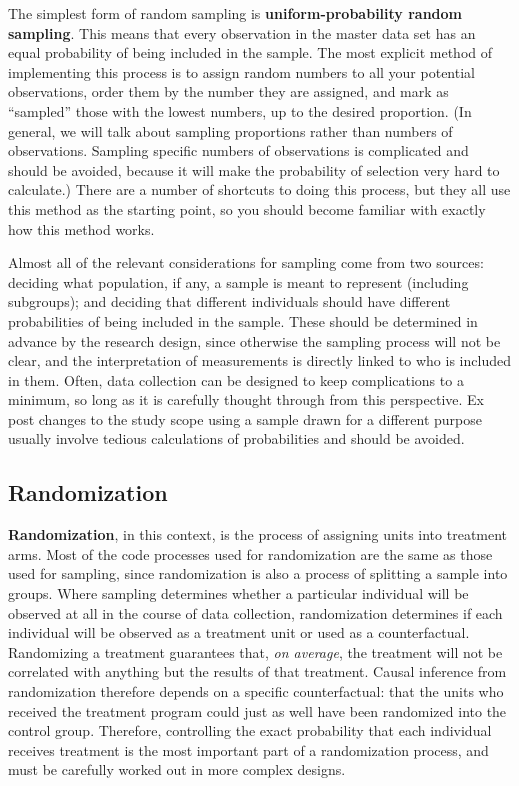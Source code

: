 The simplest form of random sampling is \textbf{uniform-probability random sampling}.
This means that every observation in the master data set
has an equal probability of being included in the sample.
The most explicit method of implementing this process
is to assign random numbers to all your potential observations,
order them by the number they are assigned,
and mark as ``sampled'' those with the lowest numbers, up to the desired proportion.
(In general, we will talk about sampling proportions rather than numbers of observations.
Sampling specific numbers of observations is complicated and should be avoided,
because it will make the probability of selection very hard to calculate.)
There are a number of shortcuts to doing this process,
but they all use this method as the starting point,
so you should become familiar with exactly how this method works.

Almost all of the relevant considerations for sampling come from two sources:
deciding what population, if any, a sample is meant to represent (including subgroups);
and deciding that different individuals should have different probabilities
of being included in the sample.
These should be determined in advance by the research design,
since otherwise the sampling process will not be clear,
and the interpretation of measurements is directly linked to who is included in them.
Often, data collection can be designed to keep complications to a minimum,
so long as it is carefully thought through from this perspective.
Ex post changes to the study scope using a sample drawn for a different purpose
usually involve tedious calculations of probabilities and should be avoided.


\subsection{Randomization}

\textbf{Randomization}, in this context, is the process of assigning units into treatment arms.
Most of the code processes used for randomization are the same as those used for sampling,
since randomization is also a process of splitting a sample into groups.
Where sampling determines whether a particular individual
will be observed at all in the course of data collection,
randomization determines if each individual will be observed
as a treatment unit or used as a counterfactual.
Randomizing a treatment guarantees that, \textit{on average},
the treatment will not be correlated with anything but the results of that treatment.\cite{duflo2007using}
Causal inference from randomization therefore depends on a specific counterfactual:
that the units who received the treatment program
could just as well have been randomized into the control group.
Therefore, controlling the exact probability that each individual receives treatment
is the most important part of a randomization process,
and must be carefully worked out in more complex designs.


